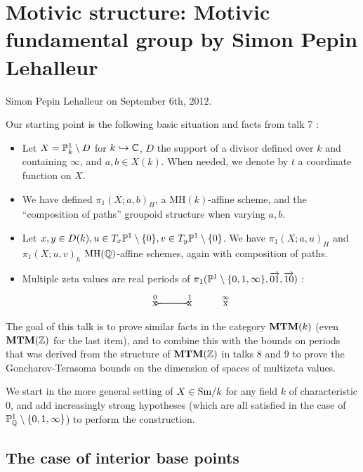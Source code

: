 \chapter{Motivic structure: Motivic fundamental group by Simon Pepin Lehalleur}

Simon Pepin Lehalleur on September 6th, 2012.

\medskip
\medskip

Our starting point is the following basic situation and facts from talk 7 :

\begin{itemize}
\item Let $X = \mathbb{P}^1_k \setminus D$ for $k \hookrightarrow \mathbb{C}$, $D$ the support of a divisor defined over $k$ and containing $\infty$, and $a, b \in X(k)$. When needed, we denote by $t$ a coordinate function on $X$.
\item We have defined $\pi_1(X;a,b)_H$, a $\mathrm{MH}(k)$-affine scheme, and the ``composition of paths'' groupoid structure when varying $a,b$.
\item Let $x, y \in D(k), u \in T_x \mathbb{P}^1 \setminus \{0\}, v \in T_y \mathbb{P}^1 \setminus \{0\}$. We have $\pi_1(X;a,u)_H$ and $\pi_1(X;u,v)_h$ $\mathrm{MH}(\mathbb{Q})$-affine schemes, again with composition of paths.
\item Multiple zeta values are real periods of  $\pi_1(\mathbb{P}^1 \setminus \{ 0,1,\infty\},\overrightarrow{01},\overrightarrow{10})$ :
\[
\xymatrix{
\stackrel{0}{\mathrm{x}} \ar@{-<}[r] & \stackrel{1}{\mathrm{x}} \ar@{-<}[l] & \stackrel{\infty}{\mathrm{x}}
}
\]
\end{itemize}

The goal of this talk is to prove similar facts in the category $\mathbf{MTM}(k)$ (even $\mathbf{MTM}(\mathbb{Z})$ for the last item), and to combine this with the bounds on periods that was derived from the structure of $\mathbf{MTM}(\mathbb{Z})$ in talks 8 and 9 to prove the Goncharov-Terasoma bounds on the dimension of spaces of multizeta values.

We start in the more general setting of $X\in \mathrm{Sm}/k$ for any field $k$ of characteristic $0$, and add increasingly strong hypotheses (which are all satisfied in the case of $\mathbb{P}^1_{\mathbb{Q}}\setminus\{0,1,\infty\}$) to perform the construction. 

\section{The case of interior base points}

